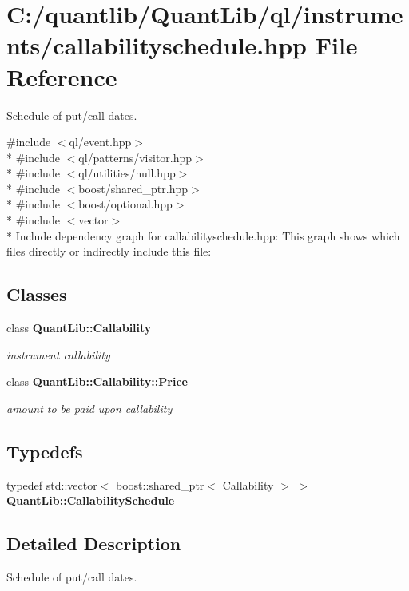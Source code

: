\section{C\+:/quantlib/\+Quant\+Lib/ql/instruments/callabilityschedule.hpp File Reference}
\label{callabilityschedule_8hpp}


Schedule of put/call dates.  


{\ttfamily \#include $<$ql/event.\+hpp$>$}\\*
{\ttfamily \#include $<$ql/patterns/visitor.\+hpp$>$}\\*
{\ttfamily \#include $<$ql/utilities/null.\+hpp$>$}\\*
{\ttfamily \#include $<$boost/shared\+\_\+ptr.\+hpp$>$}\\*
{\ttfamily \#include $<$boost/optional.\+hpp$>$}\\*
{\ttfamily \#include $<$vector$>$}\\*
Include dependency graph for callabilityschedule.\+hpp\+:
This graph shows which files directly or indirectly include this file\+:
\subsection*{Classes}
\begin{DoxyCompactItemize}
\item 
class {\bf Quant\+Lib\+::\+Callability}
\begin{DoxyCompactList}\small\item\em instrument callability \end{DoxyCompactList}\item 
class {\bf Quant\+Lib\+::\+Callability\+::\+Price}
\begin{DoxyCompactList}\small\item\em amount to be paid upon callability \end{DoxyCompactList}\end{DoxyCompactItemize}
\subsection*{Typedefs}
\begin{DoxyCompactItemize}
\item 
typedef std\+::vector$<$ boost\+::shared\+\_\+ptr$<$ Callability $>$ $>$ {\bfseries Quant\+Lib\+::\+Callability\+Schedule}\label{callabilityschedule_8hpp_a871389d1de7aff80898376823650c2a5}

\end{DoxyCompactItemize}


\subsection{Detailed Description}
Schedule of put/call dates. 

